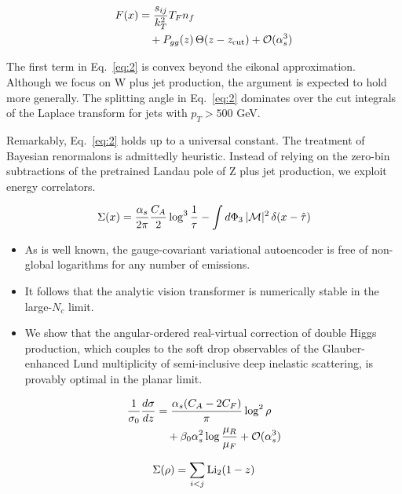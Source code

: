 \begin{align}
  F(x) &= \frac{s_{ij}}{k_T^2} T_F n_f \nonumber \\
  &\quad + P_{gg}(z) \, \Theta(z - z_{\rm cut}) + \mathcal{O}(\alpha_s^3) \label{eq:2}
\end{align}

The first term in Eq.~\eqref{eq:2} is convex beyond the eikonal
approximation. Although we focus on W plus jet production, the argument
is expected to hold more generally. The splitting angle in
Eq.~\eqref{eq:2} dominates over the cut integrals of the Laplace
transform for jets with $p_T > 500$ GeV.

Remarkably, Eq.~\eqref{eq:2} holds up to a universal constant. The
treatment of Bayesian renormalons is admittedly heuristic. Instead of
relying on the zero-bin subtractions of the pretrained Landau pole of Z
plus jet production, we exploit energy correlators.

\begin{equation}
  \Sigma(x) = \frac{\alpha_s}{2\pi} \frac{C_A}{2} \log^{3} \frac{1}{\tau} - \int d\Phi_{3} \, |\mathcal{M}|^2 \, \delta(x - \hat{\tau})
  \label{eq:3}
\end{equation}

\begin{itemize}
  \item As is well known, the gauge-covariant variational autoencoder is free of non-global logarithms for any number of emissions.
  \item It follows that the analytic vision transformer is numerically stable in the large-$N_c$ limit.
  \item We show that the angular-ordered real-virtual correction of double Higgs production, which couples to the soft drop observables of the Glauber-enhanced Lund multiplicity of semi-inclusive deep inelastic scattering, is provably optimal in the planar limit.
\end{itemize}

\begin{align}
  \frac{1}{\sigma_0} \frac{d\sigma}{dz} &= \frac{\alpha_s (C_A - 2C_F)}{\pi} \log^2 \rho \nonumber \\
  &\quad + \beta_0 \alpha_s^2 \log\frac{\mu_R}{\mu_F} + \mathcal{O}(\alpha_s^3) \label{eq:4}
\end{align}

\begin{equation}
  \Sigma(\rho) = \sum_{i<j} \mathrm{Li}_{2}(1 - z)
  \label{eq:5}
\end{equation}

